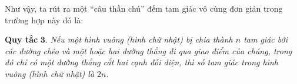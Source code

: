 		\vskip 0.1cm
		Như vậy, ta rút ra một “câu thần chú” đếm tam giác vô cùng đơn giản trong trường hợp này đó là:
		\begin{figure}[H]
			\centering
			\vspace*{-5pt}
			\captionsetup{labelformat= empty, justification=centering}
			\captionsetup[subfigure]{labelformat=empty}
			\hfill{}
			\hfill
			\hfill
			\vspace*{-10pt}
		\end{figure} 
	\vskip 0.1cm
	\textbf{\color{toancuabi}Quy tắc} $\pmb{3.}$ \textit{Nếu một hình vuông (hình chữ nhật) bị chia thành $n$ tam giác bởi các đường chéo và một hoặc hai đường thẳng đi qua giao điểm của chúng, trong đó chỉ có một đường thẳng cắt hai cạnh đối diện, thì số tam giác trong hình vuông (hình chữ nhật) là $2n$.}
	\vskip 0.1cm
